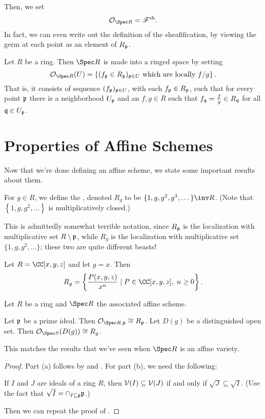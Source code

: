 Then, we set \[ \OO_{\Spec R} = \SF\sh. \]
In fact, we can even write out the definition of the sheafification,
by viewing the germ at each point as an element of $R_\mathfrak p$.
\begin{definition}
	Let $R$ be a ring. Then $\Spec R$ is made into a ringed space by setting
	\[ \OO_{\Spec R}(U) 
		= \left\{ (f_\pp \in R_\pp)_{\pp \in U}
		\text{ which are locally $f/g$} \right\}. \]
	That is, it consists of sequence $(f_\mathfrak p)_{\mathfrak p \in U}$, with
	each $f_\mathfrak p \in R_\mathfrak p$, such that for every point $\mathfrak p$ there
	is a neighborhood $U_\mathfrak p$ and an $f,g \in R$ such that
	$f_\mathfrak q = \frac fg \in R_\mathfrak q$ for all $\mathfrak q \in U_\mathfrak p$.
\end{definition}

\section{Properties of Affine Schemes}
Now that we're done defining an affine scheme,
we state some important results about them.

\begin{definition}
	For $g \in R$, we define the ,
	denoted $R_g$ to be $\{1, g, g^2, g^3, \dots\}\inv R$.
	(Note that $\left\{ 1, g, g^2, \dots \right\}$ is multiplicatively closed.)
\end{definition}
This is admittedly somewhat terrible notation, since $R_\mathfrak p$
is the localization with multiplicative set $R \setminus \mathfrak p$,
while $R_g$ is the localization with multiplicative set $\{1,g,g^2,\dots\}$;
these two are quite different beasts!

\begin{example}
	Let $R = \CC[x,y,z]$ and let $g = x$.
	Then
	\[ R_g = \left\{ \frac{P(x,y,z)}{x^n} \mid
		P \in \CC[x,y,z], \; n \ge 0 \right\}. \]
\end{example}
\begin{theorem}
	Let $R$ be a ring and $\Spec R$ the associated affine scheme.
	\begin{enumerate}[(a)]
		\ii Let $\mathfrak p$ be a prime ideal.
		Then $\OO_{\Spec R, \pp} \cong R_\pp$.
		\ii Let $D(g)$ be a distinguished open set.
		Then $\OO_{\Spec S}(D(g)) \cong R_g$.
	\end{enumerate}
\end{theorem}
This matches the results that we've seen when $\Spec R$ is an affine variety.
\begin{proof}
	Part (a) follows by 
	and .
	For part (b), we need the following:
	\begin{ques}
		If $I$ and $J$ are ideals of a ring $R$,
		then $\mathcal V(I) \subseteq \mathcal V(J)$ if and only if
		$\sqrt{J} \subseteq \sqrt{I}$.
		(Use the fact that $\sqrt I = \cap_{I \subseteq \mathfrak p} \mathfrak p$.)
	\end{ques}
	Then we can repeat the proof of .
\end{proof}

